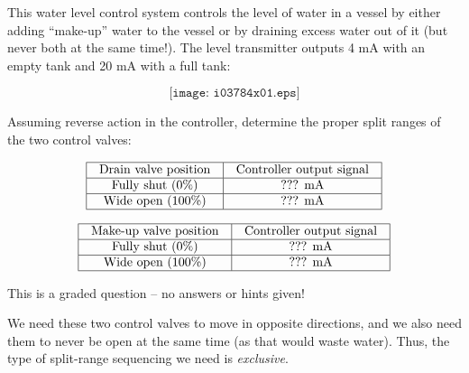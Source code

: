 

This water level control system controls the level of water in a vessel by either adding ``make-up'' water to the vessel or by draining excess water out of it (but never both at the same time!).  The level transmitter outputs 4 mA with an empty tank and 20 mA with a full tank:
 
$$\texttt{[image: i03784x01.eps]}$$

Assuming reverse action in the controller, determine the proper split ranges of the two control valves:


$$\vbox{\offinterlineskip
\halign{\strut
\vrule \quad\hfil # \ \hfil & 
\vrule \quad\hfil # \ \hfil \vrule \cr
\noalign{\hrule}
%
Drain valve position & Controller output signal \cr
%
\noalign{\hrule}
%
Fully shut (0\%) & ??? mA \cr
%
\noalign{\hrule}
%
Wide open (100\%) & ??? mA \cr
%
\noalign{\hrule}
} %
}$$ %


$$\vbox{\offinterlineskip
\halign{\strut
\vrule \quad\hfil # \ \hfil & 
\vrule \quad\hfil # \ \hfil \vrule \cr
\noalign{\hrule}
%
Make-up valve position & Controller output signal \cr
%
\noalign{\hrule}
%
Fully shut (0\%) & ??? mA \cr
%
\noalign{\hrule}
%
Wide open (100\%) & ??? mA \cr
%
\noalign{\hrule}
} %
}$$ %


\vfil 

\eject






This is a graded question -- no answers or hints given!







We need these two control valves to move in opposite directions, and we also need them to never be open at the same time (as that would waste water).  Thus, the type of split-range sequencing we need is {\it exclusive}.

